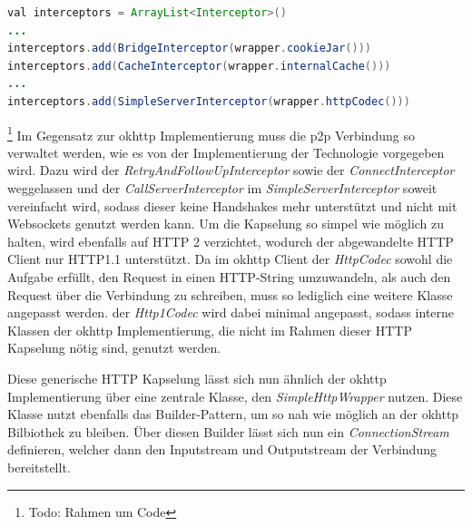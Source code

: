 \documentclass[12pt,a4paper]{article}
\begin{document}
        \begin{lstlisting}[language=Java, caption=Änderungen an okhttp (Client: Kotlin)]
val interceptors = ArrayList<Interceptor>()
...
interceptors.add(BridgeInterceptor(wrapper.cookieJar()))
interceptors.add(CacheInterceptor(wrapper.internalCache()))
...
interceptors.add(SimpleServerInterceptor(wrapper.httpCodec()))
        \end{lstlisting}
        \footnote{Todo: Rahmen um Code} Im Gegensatz zur okhttp Implementierung muss die p2p Verbindung so verwaltet werden, wie es von der Implementierung der Technologie vorgegeben wird. Dazu wird der {\it RetryAndFollowUpInterceptor} sowie der {\it ConnectInterceptor} weggelassen und der {\it CallServerInterceptor} im {\it SimpleServerInterceptor} soweit vereinfacht wird, sodass dieser keine Handshakes mehr unterstützt und nicht mit Websockets genutzt werden kann.
        Um die Kapselung so simpel wie möglich zu halten, wird ebenfalls auf HTTP 2 verzichtet, wodurch der abgewandelte HTTP Client nur HTTP1.1 unterstützt. Da im okhttp Client der {\it HttpCodec} sowohl die Aufgabe erfüllt, den Request in einen HTTP-String umzuwandeln, als auch den Request über die Verbindung zu schreiben, muss so lediglich eine weitere Klasse angepasst werden. der {\it Http1Codec} wird dabei minimal angepasst, sodass interne Klassen der okhttp Implementierung, die nicht im Rahmen dieser HTTP Kapselung nötig sind, genutzt werden.
        
        
        Diese generische HTTP Kapselung lässt sich nun ähnlich der okhttp Implementierung über eine zentrale Klasse, den {\it SimpleHttpWrapper} nutzen. Diese Klasse nutzt ebenfalls das Builder-Pattern, um so nah wie möglich an der okhttp Bilbiothek zu bleiben. Über diesen Builder lässt sich nun ein {\it ConnectionStream} definieren, welcher dann den Inputstream und Outputstream der Verbindung bereitstellt.
        
\end{document}
